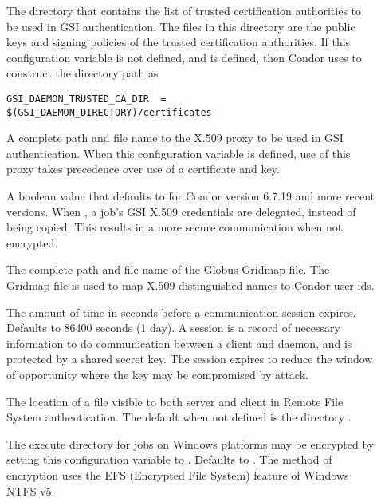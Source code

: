 \begin{description}
\item[]
\label{param:GSIDaemonTrustedCADir} The directory that contains the
list of trusted certification authorities to be used in GSI authentication.
The files in this directory are the public keys and signing policies
of the trusted certification authorities.
If this configuration variable is not defined, and
 is defined, then Condor uses
 to construct the directory path as
\begin{verbatim}
GSI_DAEMON_TRUSTED_CA_DIR  = $(GSI_DAEMON_DIRECTORY)/certificates
\end{verbatim}

\item[]
\label{param:GSIDaemonProxy} A complete path and file name to the
X.509 proxy to be used in GSI authentication.
When this configuration variable is defined, use of this proxy
takes precedence over use of a certificate and key.

\item[]
\label{param:DelegateJobGSICredentials} 
A boolean value that defaults to  for Condor version 6.7.19
and more recent versions.
When , a job's GSI X.509 credentials are delegated,
instead of being copied.
This results in a more secure communication when not encrypted.

\item[]
\label{param:GridMap}
The complete path and file name of the Globus Gridmap file.
The Gridmap file is used to map
X.509 distinguished names to Condor user ids.

\item[]
\label{param:SessionDuration} The amount of time in seconds before
a communication session expires.
Defaults to 86400 seconds (1 day).
A session is a record of necessary information to do communication
between a client and daemon, and is protected by a shared secret key.
The session expires to reduce the window of opportunity where
the key may be compromised by attack.

\item[]
\label{param:FSRemoteDir}
The location of a file visible to both server and client in
Remote File System authentication.
The default when not defined is the directory 
.

\item[]
\label{param:EncryptExecuteDirectory}
The execute directory for jobs on Windows platforms may be
encrypted by setting this configuration variable to .
Defaults to .
The method of encryption uses the EFS (Encrypted File System)
feature of Windows NTFS v5.


\end{description}
